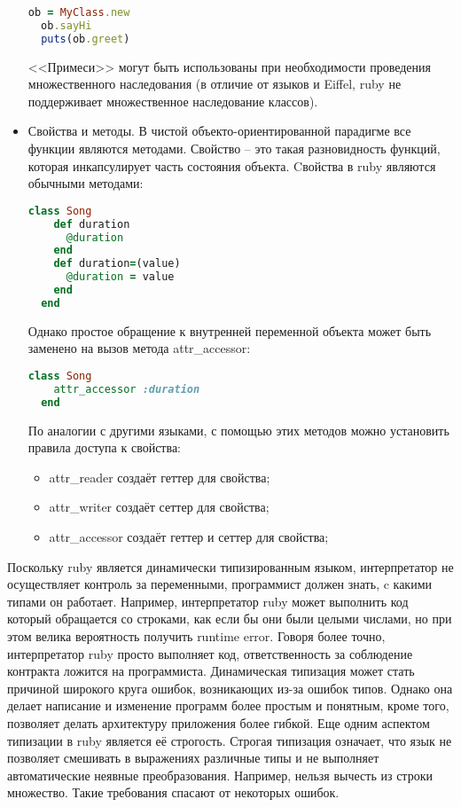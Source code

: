 \begin{itemize}
\begin{lstlisting}[language=Ruby, style=rubystyle]
  ob = MyClass.new
  ob.sayHi
  puts(ob.greet)
        \end{lstlisting}
        <<Примеси>> могут быть использованы при необходимости проведения множественного наследования (в отличие от языков \cpp{} и Eiffel, ruby не поддерживает множественное наследование классов).
  \item Свойства и методы.
        В чистой объекто-ориентированной парадигме все функции являются методами.
        Свойство -- это такая разновидность функций, которая инкапсулирует часть состояния объекта.
        Cвойства в ruby являются обычными методами:
        \begin{lstlisting}[language=Ruby, style=rubystyle]
  class Song
    def duration
      @duration
    end
    def duration=(value)
      @duration = value
    end
  end
         \end{lstlisting}
         Однако простое обращение к внутренней переменной объекта может быть заменено на вызов метода attr\_accessor:
         \begin{lstlisting}[language=Ruby, style=rubystyle]
  class Song
    attr_accessor :duration
  end
         \end{lstlisting}
        По аналогии с другими языками, с помощью этих методов можно установить правила доступа к свойства: \cite{trpr_2011_ru}
        \begin{itemize}
        \item attr\_reader создаёт геттер для свойства;
        \item attr\_writer создаёт сеттер для свойства;
        \item attr\_accessor создаёт геттер и сеттер для свойства;
        \end{itemize}
\end{itemize}

Поскольку ruby является динамически типизированным языком, интерпретатор не осуществляет контроль за переменными, программист должен знать, c какими типами он работает.
Например, интерпретатор ruby может выполнить код который обращается со строками, как если бы они были целыми числами, но при этом велика вероятность получить runtime error.
Говоря более точно, интерпретатор ruby просто выполняет код, ответственность за соблюдение контракта ложится на программиста.
Динамическая типизация может стать причиной широкого круга ошибок, возникающих из-за ошибок типов.
Однако она делает написание и изменение программ более простым и понятным, кроме того, позволяет делать архитектуру приложения более гибкой.
Еще одним аспектом типизации в ruby является её строгость.
Строгая типизация означает, что язык не позволяет смешивать в выражениях различные типы и не выполняет автоматические неявные преобразования.
Например, нельзя вычесть из строки множество. Такие требования спасают от некоторых ошибок.

